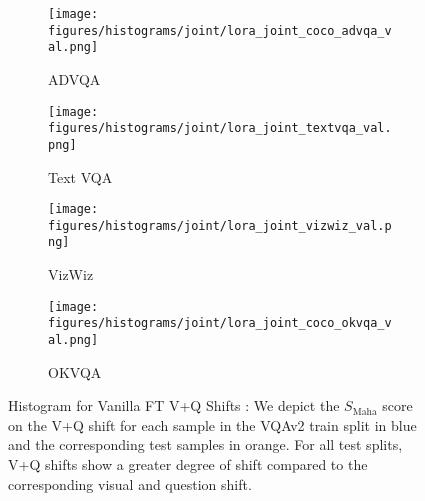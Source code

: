 \begin{figure*}[!h]
    \begin{subfigure}[b]{0.3\linewidth}
        \centering
        \texttt{[image: figures/histograms/joint/lora\_joint\_coco\_advqa\_val.png]}
        \caption{ADVQA}
        \label{fig:vqaadvqa}
    \end{subfigure}
    \hfill
    \begin{subfigure}[b]{0.3\linewidth}
        \centering
        \texttt{[image: figures/histograms/joint/lora\_joint\_textvqa\_val.png]}
        \caption{Text VQA}
        \label{fig:vqatextvqa}
    \end{subfigure}
    \hfill
    \begin{subfigure}[b]{0.3\linewidth}
        \centering
        \texttt{[image: figures/histograms/joint/lora\_joint\_vizwiz\_val.png]}
        \caption{VizWiz}
        \label{fig:vqavizwiz}
    \end{subfigure}

    \vspace{0.5cm} %

    \begin{subfigure}[b]{0.3\linewidth}
        \centering
        \texttt{[image: figures/histograms/joint/lora\_joint\_coco\_okvqa\_val.png]}
        \caption{OKVQA}
        \label{fig:vqaokvqa}
    \end{subfigure}

    \caption{Histogram for Vanilla FT V+Q Shifts : We depict the \( S_{\text{Maha}} \) score on the V+Q shift for each sample in the VQAv2 train split in blue and the corresponding test samples in orange. For all test splits, V+Q shifts show a greater degree of shift compared to the corresponding visual and question shift.}
    \label{fig:vqa_histograms}
\end{figure*}















